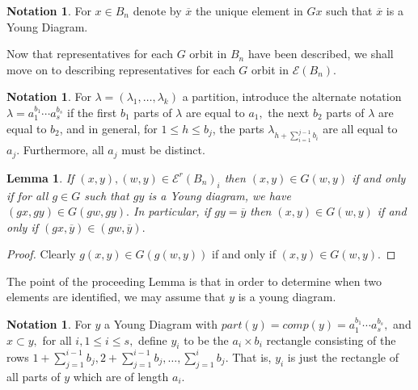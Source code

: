 \documentclass[10 pt]{amsart}
\theoremstyle{plain}
\newtheorem{lem}[thm]{Lemma}
\theoremstyle{definition}
\newtheorem{note}[thm]{Notation}
\theoremstyle{remark}
\numberwithin{equation}{section}
\begin{document}
\begin{note}
For $x \in B_n$ denote by $\overline{x}$ the unique element in $Gx$ such that $\overline{x}$ is a Young Diagram.
\end{note}

Now that representatives for each $G$ orbit in $B_n$ have been described, we shall move on to describing representatives for each $G$ orbit in $\mathcal E(B_n).$

\begin{note}
For $\lambda = (\lambda_1,\ldots, \lambda_k)$ a partition, introduce the alternate notation $\lambda = a_1^{b_1} \cdots a_s^{b_s}$ if the first $b_1$ parts of $\lambda$ are equal to $a_1,$ the next $b_2$ parts of $\lambda$ are equal to $b_2$, and in general, for $1 \leq h\leq b_j$, the parts $ \lambda_{h+\sum_{i=1}^{j-1} b_i}$ are all equal to $a_j.$ Furthermore, all $a_j$ must be distinct.
\end{note}

\begin{lem}
\label{lem:young_diag_reduction}
If $(x, y), (w, y) \in\mathcal E^r(B_n)_i$ then $(x, y) \in G(w, y)$ if and only if for all $g \in G$ such that $gy$ is a Young diagram, we have $(gx, gy) \in G(gw, gy).$ In particular, if $gy = \overline y$ then $(x, y) \in G(w, y)$ if and only if $(gx, \overline y) \in (gw, \overline y).$
\end{lem}
\begin{proof}
Clearly $g(x, y) \in G(g(w, y))$ if and only if $(x, y) \in G(w, y).$
\end{proof}

The point of the proceeding Lemma is that in order to determine when two elements are identified, we may assume that $y$ is a young diagram.

\begin{note}
For $y$ a Young Diagram with $part(y) = comp(y) = a_1^{b_1}\cdots a_s^{b_s},$ and $x \subset y,$ for all $i,1 \leq i \leq s,$ define $y_i$ to be the $a_i \times b_i$ rectangle consisting of the rows $1+\sum_{j = 1}^{i-1} b_j,2+\sum_{j = 1}^{i-1} b_j,\ldots, \sum_{j = 1}^{i} b_j.$ That is, $y_i$ is just the rectangle of all parts of $y$ which are of length $a_i.$
\end{note}
\end{document}
